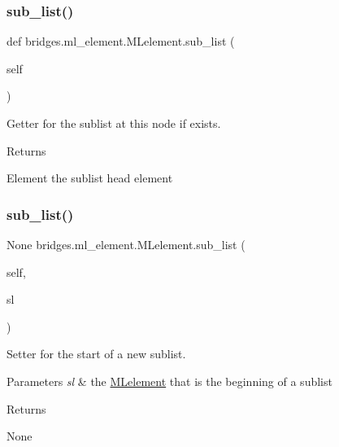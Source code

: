 \subsubsection{\texorpdfstring{sub\_list()}{sub\_list()}\hspace{0.1cm}{\footnotesize\ttfamily [1/2]}}
{\footnotesize\ttfamily def bridges.\+ml\+\_\+element.\+M\+Lelement.\+sub\+\_\+list (\begin{DoxyParamCaption}\item[{}]{self }\end{DoxyParamCaption})}



Getter for the sublist at this node if exists. 

\begin{DoxyReturn}{Returns}


Element the sublist head element 
\end{DoxyReturn}
\mbox{\label{classbridges_1_1ml__element_1_1_m_lelement_a7d86232e446b7628b35963de4730ceb7}} 
\subsubsection{\texorpdfstring{sub\_list()}{sub\_list()}\hspace{0.1cm}{\footnotesize\ttfamily [2/2]}}
{\footnotesize\ttfamily  None bridges.\+ml\+\_\+element.\+M\+Lelement.\+sub\+\_\+list (\begin{DoxyParamCaption}\item[{}]{self,  }\item[{}]{sl }\end{DoxyParamCaption})}



Setter for the start of a new sublist. 


\begin{DoxyParams}{Parameters}
{\em sl} & the \mbox{\hyperlink{classbridges_1_1ml__element_1_1_m_lelement}{M\+Lelement}} that is the beginning of a sublist \\
\hline
\end{DoxyParams}
\begin{DoxyReturn}{Returns}


None 
\end{DoxyReturn}
\mbox{\label{classbridges_1_1ml__element_1_1_m_lelement_a2b5880a300ec49c905b035f0fbb606cf}} 
